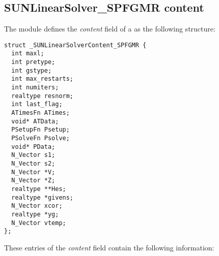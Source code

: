 \subsection{SUNLinearSolver\_SPFGMR content}
\label{ss:sunlinsol_spfgmr_content}

The {\sunlinsolspfgmr} module defines the \textit{content} field of a
 as the following structure:
\begin{verbatim}
struct _SUNLinearSolverContent_SPFGMR {
  int maxl;
  int pretype;
  int gstype;
  int max_restarts;
  int numiters;
  realtype resnorm;
  int last_flag;
  ATimesFn ATimes;
  void* ATData;
  PSetupFn Psetup;
  PSolveFn Psolve;
  void* PData;
  N_Vector s1;
  N_Vector s2;
  N_Vector *V;
  N_Vector *Z;
  realtype **Hes;
  realtype *givens;
  N_Vector xcor;
  realtype *yg;
  N_Vector vtemp;
};
\end{verbatim}
These entries of the \emph{content} field contain the following
information:
